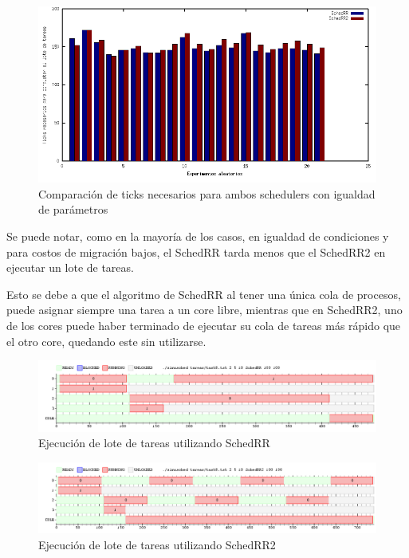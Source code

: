 \documentclass[a4paper,10pt,twoside]{article}
\begin{document}
\begin{figure}[ht!]
\centering
\includegraphics[width=175mm]{../ejercicio8/comTicksSchedIgualdad.png}
\caption{Comparación de ticks necesarios para ambos schedulers con igualdad de parámetros}
\label{overflow}
\end{figure}

Se puede notar, como en la mayoría de los casos, en igualdad de condiciones y para costos de migración bajos, el SchedRR tarda menos que el SchedRR2 en ejecutar un lote de tareas.

Esto se debe a que el algoritmo de SchedRR al tener una única cola de procesos, puede asignar siempre una tarea a un core libre, mientras que en SchedRR2, uno de los cores puede haber terminado de ejecutar su cola de tareas más rápido que el otro core, quedando este sin utilizarse.

\begin{figure}[ht!]
\centering
\includegraphics[width=175mm]{../ejercicio8/schedRRej8.png}
\caption{Ejecución de lote de tareas utilizando SchedRR}
\label{overflow}
\end{figure}

\begin{figure}[ht!]
\centering
\includegraphics[width=175mm]{../ejercicio8/schedRR2ej8.png}
\caption{Ejecución de lote de tareas utilizando SchedRR2}
\label{overflow}
\end{figure}
\end{document}
